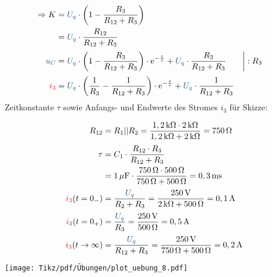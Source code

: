 {\begin{align*}
    \Rightarrow K &= \ecv{U_q} \cdot \left( 1 - \frac{R_3}{R_{12}+R_3} \right)\\
    &= \ecv{U_q} \cdot \frac{R_{12}}{R_{12}+R_3}\\[2pt]
    \ecv{u_C} &= \ecv{U_q} \cdot \left( 1 - \frac{R_3}{R_{12}+R_3} \right) \cdot \mathrm{e}^{-\frac{t}{\tau}} + \ecv{U_q} \cdot \frac{R_3}{R_{12}+R_3}& &\bigg| :R_3\\[2pt]
    \eci{i_3} &= \ecv{U_q} \cdot \left( \frac{1}{R_3} - \frac{1}{R_{12}+R_3} \right) \cdot \mathrm{e}^{-\frac{t}{\tau}} + \ecv{U_q} \cdot \frac{1}{R_{12}+R_3}
\end{align*}
Zeitkonstante $\tau$ sowie Anfangs- und Endwerte des Stromes $i_3$ für Skizze:\\
\begin{minipage}{0.5\textwidth}%
\begin{align*}
    R_{12} &= R_1||R_2 = \frac{1,2\,\mathrm{k}\Omega \cdot 2\,\mathrm{k}\Omega}{1,2\,\mathrm{k}\Omega + 2\,\mathrm{k}\Omega} = 750\,\Omega\\[2pt]
    \tau &= C_1 \cdot \frac{R_{12} \cdot R_3}{R_{12} + R_3} \\
    &= 1\,\mu \mathrm{F} \cdot \frac{750\,\Omega \cdot 500\,\Omega}{750\,\Omega + 500\,\Omega} = 0,3\,\mathrm{ms} \\[2pt]
    \eci{i_3}(t=0_{-}) &= \frac{\ecv{U_q}}{R_{2}+R_3} = \frac{250\,\mathrm{V}}{2\,\mathrm{k}\Omega + 500\,\Omega} = 0,1\,\mathrm{A}\\[2pt]
    \eci{i_3}(t=0_{+}) &= \frac{\ecv{U_q}}{R_3} = \frac{250\,\mathrm{V}}{500\,\Omega} = 0,5\,\mathrm{A}\\[2pt]
    \eci{i_3}(t\to\infty) &= \frac{\ecv{U_q}}{R_{12}+R_3} = \frac{250\,\mathrm{V}}{750\,\Omega + 500\,\Omega} = 0,2\,\mathrm{A}
\end{align*}
\end{minipage}%
\begin{minipage}{0.5\textwidth}\centering%
\texttt{[image: Tikz/pdf/Übungen/plot\_uebung\_8.pdf]}
\end{minipage}
}


